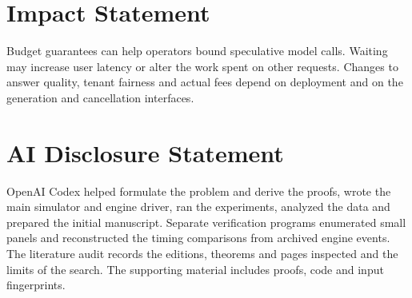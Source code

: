 \documentclass{article}
\begin{document}


\FloatBarrier
\section*{Impact Statement}
Budget guarantees can help operators bound speculative model calls. Waiting may increase user latency or alter the work spent on other requests. Changes to answer quality, tenant fairness and actual fees depend on deployment and on the generation and cancellation interfaces.
\section*{AI Disclosure Statement}
OpenAI Codex helped formulate the problem and derive the proofs, wrote the main simulator and engine driver, ran the experiments, analyzed the data and prepared the initial manuscript. Separate verification programs enumerated small panels and reconstructed the timing comparisons from archived engine events. The literature audit records the editions, theorems and pages inspected and the limits of the search. The supporting material includes proofs, code and input fingerprints.


\clearpage\appendix\onecolumn

\end{document}
